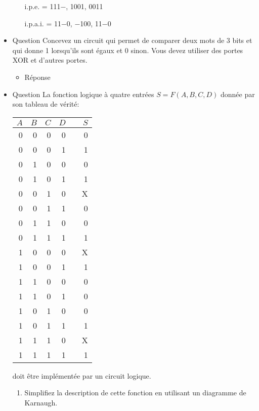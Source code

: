 \documentclass[letter, oneside]{book}
\begin{document}
\begin{itemize}
\begin{itemize}
i.p.e.   = 111−, 1001, 0011

i.p.a.i. = 11−0, −100, 11−0
\end{itemize}

\item Question
\label{sec:orgc089fe0}
Concevez un circuit qui permet de comparer deux mots de 3 bits et qui
donne 1 lorsqu'ils sont égaux et 0 sinon. Vous devez utiliser des
portes XOR et d'autres portes.

\begin{itemize}
\item Réponse
\label{sec:orgc42356f}
\begin{center}

\end{center}
\end{itemize}

\item Question
\label{sec:org1d9bd69}
La fonction logique à quatre entrées \(S = F(A,B,C, D)\) donnée par
son tableau de vérité:
\begin{center}
\begin{tabular}{rrrrlr}
\(A\) & \(B\) & \(C\) & \(D\) &  & \(S\)\\[0pt]
\hline
0 & 0 & 0 & 0 &  & 0\\[0pt]
0 & 0 & 0 & 1 &  & 1\\[0pt]
0 & 1 & 0 & 0 &  & 0\\[0pt]
0 & 1 & 0 & 1 &  & 1\\[0pt]
0 & 0 & 1 & 0 &  & X\\[0pt]
0 & 0 & 1 & 1 &  & 0\\[0pt]
0 & 1 & 1 & 0 &  & 0\\[0pt]
0 & 1 & 1 & 1 &  & 1\\[0pt]
1 & 0 & 0 & 0 &  & X\\[0pt]
1 & 0 & 0 & 1 &  & 1\\[0pt]
1 & 1 & 0 & 0 &  & 0\\[0pt]
1 & 1 & 0 & 1 &  & 0\\[0pt]
1 & 0 & 1 & 0 &  & 0\\[0pt]
1 & 0 & 1 & 1 &  & 1\\[0pt]
1 & 1 & 1 & 0 &  & X\\[0pt]
1 & 1 & 1 & 1 &  & 1\\[0pt]
\end{tabular}
\end{center}
doit être implémentée par un circuit logique.

\begin{enumerate}
\item Simplifiez la description de cette fonction en utilisant un diagramme de Karnaugh.


\end{enumerate}
\end{itemize}
\end{document}
